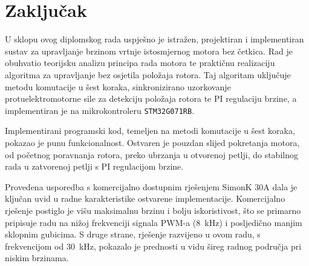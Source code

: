 \documentclass[diplomskirad]{fer}
\begin{document}

%


%


\chapter{Zaključak}
\label{pog:zakljucak}

U sklopu ovog diplomskog rada uspješno je istražen, projektiran i implementiran
sustav za upravljanje brzinom vrtnje istosmjernog motora bez četkica. Rad je
obuhvatio teorijsku analizu principa rada motora te praktičnu realizaciju
algoritma za upravljanje bez osjetila položaja rotora. Taj algoritam uključuje
metodu komutacije u šest koraka, sinkronizirano uzorkovanje protuelektromotorne
sile za detekciju položaja rotora te PI regulaciju brzine, a implementiran je
na mikrokontroleru \texttt{STM32G071RB}.

Implementirani programski kod, temeljen na metodi komutacije u šest koraka,
pokazao je punu funkcionalnost. Ostvaren je pouzdan slijed pokretanja motora,
od početnog poravnanja rotora, preko ubrzanja u otvorenoj petlji, do stabilnog
rada u zatvorenoj petlji s PI regulacijom brzine.

Provedena usporedba s komercijalno dostupnim rješenjem SimonK 30A dala je
ključan uvid u radne karakteristike ostvarene implementacije. Komercijalno
rješenje postiglo je višu maksimalnu brzinu i bolju iskoristivost, što se
primarno pripisuje radu na nižoj frekvenciji signala PWM-a
(\SI{8}{\kilo\hertz}) i posljedično manjim sklopnim gubicima. S druge strane,
rješenje razvijeno u ovom radu, s frekvencijom od \SI{30}{\kilo\hertz},
pokazalo je prednosti u vidu šireg radnog područja pri niskim brzinama.
\end{document}
